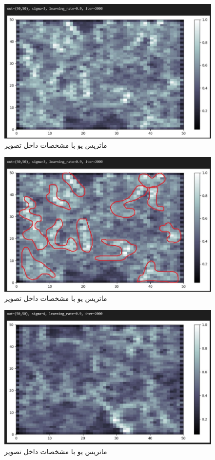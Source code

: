 \documentclass{article}
\begin{document}
\cleardoublepage

\begin{figure}[!h]
    \centering\includegraphics[scale=.65]{./p3-5}
    \caption{ماتریس یو با مشخصات داخل تصویر}\label{fig.35}
\end{figure}

\begin{figure}[!h]
    \centering\includegraphics[scale=.65]{./p3-6}
    \caption{ماتریس یو با مشخصات داخل تصویر}\label{fig.36}
\end{figure}


\cleardoublepage

\begin{figure}[!h]
    \centering\includegraphics[scale=.65]{./p3-7}
    \caption{ماتریس یو با مشخصات داخل تصویر}\label{fig.37}
\end{figure}
\end{document}
